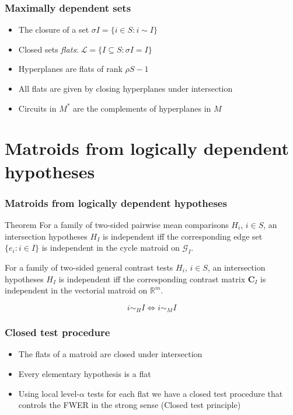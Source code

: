 \documentclass[bigger]{beamer}
\newcommand{\bs}[1]{\bm{#1}}
\begin{document}
\begin{frame}
\frametitle{Maximally dependent sets}
\begin{itemize}
\item The closure of a set $\sigma I = \{i \in S: i \sim I\}$
\item Closed sets {\em flats}: $\mathscr{L} = \{I \subseteq S: \sigma I = I\}$
\item Hyperplanes are flats of rank $\rho S - 1$
\item All flats are given by closing hyperplanes under intersection
\item Circuits in $M^*$ are the complements of hyperplanes in $M$
\end{itemize} %
\end{frame}
\section{Matroids from logically dependent hypotheses}



\begin{frame}
\frametitle{Matroids from logically dependent hypotheses}

  \begin{block}{Theorem}
    For a family of two-sided pairwise mean comparisons $H_i$, $i \in
    S$, an intersection hypotheses $H_I$ is independent iff the
    corresponding edge set $\{e_i:i \in I\}$ is independent in the
    cycle matroid on $\mathscr{G}_I$.  

For a family of two-sided
    general contrast tests $H_i$, $i \in S$, an intersection
    hypotheses $H_I$ is independent iff the corresponding contrast
    matrix $\bs{C}_I$ is independent in the vectorial matroid on
    $\mathbb{R}^m$.

    \begin{displaymath}
      i \sim_H I \Leftrightarrow i \sim_M I
    \end{displaymath}
  \end{block}


\end{frame}



\begin{frame}
\frametitle{Closed test procedure}
\begin{itemize}

\item The flats of a matroid are closed under intersection

\item Every elementary hypothesis is a flat

\item Using local level-$\alpha$ tests for each flat we have a closed test procedure that controls the FWER in the strong sense (Closed test principle)

\end{itemize} %
\end{frame}
\end{document}
